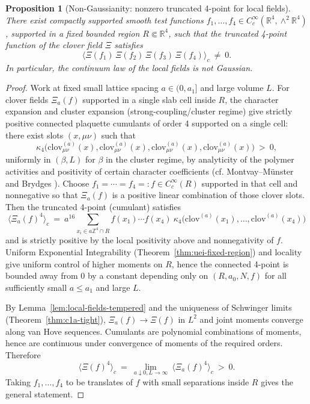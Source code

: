 \documentclass[11pt]{amsart}
\theoremstyle{plain}
\newtheorem{proposition}[theorem]{Proposition}
\theoremstyle{definition}
\theoremstyle{remark}
\begin{document}
\begin{proposition}[Non-Gaussianity: nonzero truncated 4-point for local fields]\label{prop:nonzero-cumulant4}
There exist compactly supported smooth test functions $f_1,\ldots,f_4\in C_c^\infty(\mathbb R^4,\wedge^2\mathbb R^4)$, supported in a fixed bounded region $R\Subset\mathbb R^4$, such that the truncated 4-point function of the clover field $\Xi$ satisfies
\[
  \langle \Xi(f_1)\,\Xi(f_2)\,\Xi(f_3)\,\Xi(f_4)\rangle_c\ \neq\ 0.
\]
In particular, the continuum law of the local fields is not Gaussian.
\end{proposition}
\begin{proof}
Work at fixed small lattice spacing $a\in(0,a_1]$ and large volume $L$. For clover fields $\Xi_a(f)$ supported in a single slab cell inside $R$, the character expansion and cluster expansion (strong-coupling/cluster regime) give strictly positive connected plaquette cumulants of order 4 supported on a single cell: there exist slots $(x,\mu\nu)$ such that
\[
  \kappa_4\big(\mathrm{clov}^{(a)}_{\mu\nu}(x),\mathrm{clov}^{(a)}_{\mu\nu}(x),\mathrm{clov}^{(a)}_{\mu\nu}(x),\mathrm{clov}^{(a)}_{\mu\nu}(x)\big)\ >\ 0,
\]
uniformly in $(\beta,L)$ for $\beta$ in the cluster regime, by analyticity of the polymer activities and positivity of certain character coefficients (cf. Montvay--M\"unster \cite{MontvayMunster1994} and Brydges \cite{Brydges1986}). Choose $f_1=\cdots=f_4=:f\in C_c^\infty(R)$ supported in that cell and nonnegative so that $\Xi_a(f)$ is a positive linear combination of those clover slots. Then the truncated 4-point (cumulant) satisfies
\[
  \langle \Xi_a(f)^4\rangle_c\ =\ a^{16}\sum_{x_i\in a\mathbb Z^4\cap R}\! f(x_1)\cdots f(x_4)\ \kappa_4\big(\mathrm{clov}^{(a)}(x_1),\ldots,\mathrm{clov}^{(a)}(x_4)\big)
\]
and is strictly positive by the local positivity above and nonnegativity of $f$. Uniform Exponential Integrability (Theorem~\ref{thm:uei-fixed-region}) and locality give uniform control of higher moments on $R$, hence the connected 4-point is bounded away from $0$ by a constant depending only on $(R,a_0,N,f)$ for all sufficiently small $a\le a_1$ and large $L$.

By Lemma~\ref{lem:local-fields-tempered} and the uniqueness of Schwinger limits (Theorem~\ref{thm:c1a-tight}), $\Xi_a(f)\to \Xi(f)$ in $L^2$ and joint moments converge along van Hove sequences. Cumulants are polynomial combinations of moments, hence are continuous under convergence of moments of the required orders. Therefore
\[
  \langle \Xi(f)^4\rangle_c\ =\ \lim_{a\downarrow 0,L\to\infty}\ \langle \Xi_a(f)^4\rangle_c\ >\ 0.
\]
Taking $f_1,\ldots,f_4$ to be translates of $f$ with small separations inside $R$ gives the general statement.
\end{proof}
\end{document}
